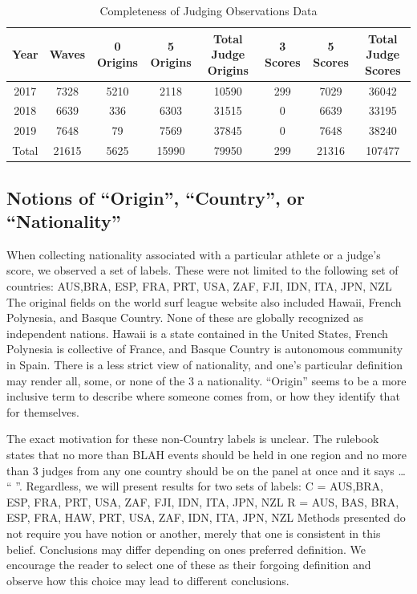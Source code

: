 \documentclass{article}
\begin{document}
\begin{table}
\caption{Completeness of Judging Observations Data}
\label{CompletenessJudgeObs}
\begin{center} \begin{tabular}{|c|c|c|c|c|c|c|c|} \hline
Year & Waves & 0 Origins & 5 Origins & Total Judge Origins &  3 Scores & 5 Scores & Total Judge Scores \\ \hline
2017 & 7328 & 5210 & 2118 & 10590 & 299 & 7029 & 36042 \\ \hline
2018 & 6639 & 336 & 6303 & 31515 & 0 & 6639 & 33195 \\ \hline
2019 & 7648 & 79 & 7569 & 37845 & 0 & 7648 & 38240 \\ \hline
Total & 21615 & 5625 & 15990 & 79950 & 299 & 21316 & 107477  \\ \hline
\end{tabular} \end{center}
\end{table}

\subsection{Notions of “Origin”, “Country”, or “Nationality”}
When collecting nationality associated with a particular athlete or a judge’s score, we observed a set of labels. These were not limited to the following set of countries:
	{AUS,BRA, ESP, FRA, PRT, USA, ZAF, FJI, IDN, ITA, JPN, NZL}
The original fields on the world surf league website also included Hawaii, French Polynesia, and Basque Country. None of these are globally recognized as independent nations. Hawaii is a state contained in the United States, French Polynesia is collective of France, and Basque Country is autonomous community in Spain. There is a less strict view of nationality, and one’s particular definition may render all, some, or none of the 3 a nationality. “Origin” seems to be a more inclusive term to describe where someone comes from, or how they identify that for themselves.

The exact motivation for these non-Country labels is unclear. The rulebook states that no more than BLAH events should be held in one region and no more than 3 judges from any one country should be on the panel at once and it says … “ ”.
Regardless, we will present results for two sets of labels:
C = {AUS,BRA, ESP, FRA, PRT, USA, ZAF, FJI, IDN, ITA, JPN, NZL}
R = {AUS, BAS, BRA, ESP, FRA, HAW, PRT, USA, ZAF, IDN, ITA, JPN, NZL}
Methods presented do not require you have notion or another, merely that one is consistent in this belief. Conclusions may differ depending on ones preferred definition. We encourage the reader to select one of these as their forgoing definition and observe how this choice may lead to different conclusions.
\end{document}
